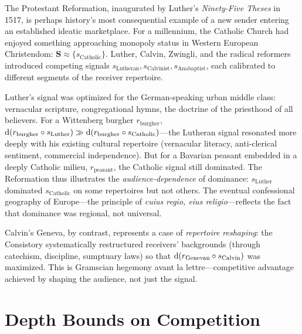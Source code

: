 \begin{example}
The Protestant Reformation, inaugurated by Luther's \textit{Ninety-Five
Theses} in 1517, is perhaps history's most consequential example of a new
sender entering an established ideatic marketplace.  For a millennium,
the Catholic Church had enjoyed something approaching monopoly status in
Western European Christendom: $\mathbf{S} \approx \{s_{\text{Catholic}}\}$.
Luther, Calvin, Zwingli, and the radical reformers introduced competing
signals $s_{\text{Lutheran}}, s_{\text{Calvinist}}, s_{\text{Anabaptist}}$,
each calibrated to different segments of the receiver repertoire.

Luther's signal was optimized for the German-speaking urban middle class:
vernacular scripture, congregational hymns, the doctrine of the
priesthood of all believers.  For a Wittenberg burgher $r_{\text{burgher}}$,
$\operatorname{d}(r_{\text{burgher}} \circ s_{\text{Luther}}) \gg
\operatorname{d}(r_{\text{burgher}} \circ s_{\text{Catholic}})$---the Lutheran
signal resonated more deeply with his existing cultural repertoire
(vernacular literacy, anti-clerical sentiment, commercial independence).
But for a Bavarian peasant embedded in a deeply Catholic milieu,
$r_{\text{peasant}}$, the Catholic signal still dominated.  The
Reformation thus illustrates the \emph{audience-dependence} of dominance:
$s_{\text{Luther}}$ dominated $s_{\text{Catholic}}$ on some repertoires
but not others.  The eventual confessional geography of Europe---the
principle of \textit{cuius regio, eius religio}---reflects the fact that
dominance was regional, not universal.

Calvin's Geneva, by contrast, represents a case of \emph{repertoire
reshaping}: the Consistory systematically restructured receivers'
backgrounds (through catechism, discipline, sumptuary laws) so that
$\operatorname{d}(r_{\text{Genevan}} \circ s_{\text{Calvin}})$ was maximized.
This is Gramscian hegemony avant la lettre---competitive advantage
achieved by shaping the audience, not just the signal.
\end{example}

\section{Depth Bounds on Competition}
\label{sec:ch11-bounds}

